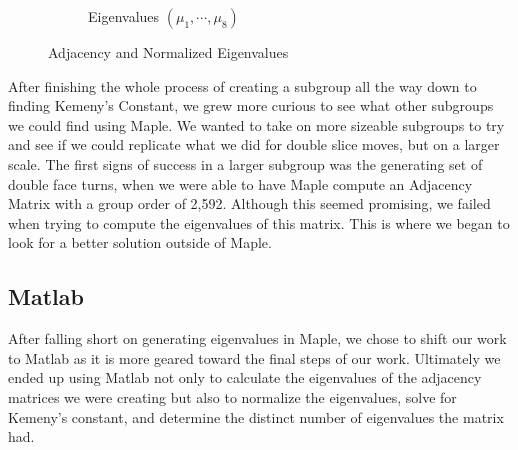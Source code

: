 \documentclass{article}
\begin{document}
\begin{figure}[!ht]
\begin{subfigure}[b]{0.4\textwidth}
        \caption{Eigenvalues $(\mu_1,\cdots,\mu_8)$}
        \label{fig:Normalized eigenvalues}
    \end{subfigure}
    \caption{Adjacency and Normalized Eigenvalues}
    \label{fig:two sets}
\end{figure}

After finishing the whole process of creating a subgroup all the way down to finding Kemeny's Constant, we grew more curious to see what other subgroups we could find using Maple.  We wanted to take on more sizeable subgroups to try and see if we could replicate what we did for double slice moves, but on a larger scale.  The first signs of success in a larger subgroup was the generating set of double face turns, when we were able to have Maple compute an Adjacency Matrix with a group order of 2,592.  Although this seemed promising, we failed when trying to compute the eigenvalues of this matrix.  This is where we began to look for a better solution outside of Maple.

\subsection{Matlab}
After falling short on generating eigenvalues in Maple, we chose to shift our work to Matlab as it is more geared toward the final steps of our work.  Ultimately we ended up using Matlab not only to calculate the eigenvalues of the adjacency matrices we were creating but also to normalize the eigenvalues, solve for Kemeny's constant, and determine the distinct number of eigenvalues the matrix had.
\end{document}
